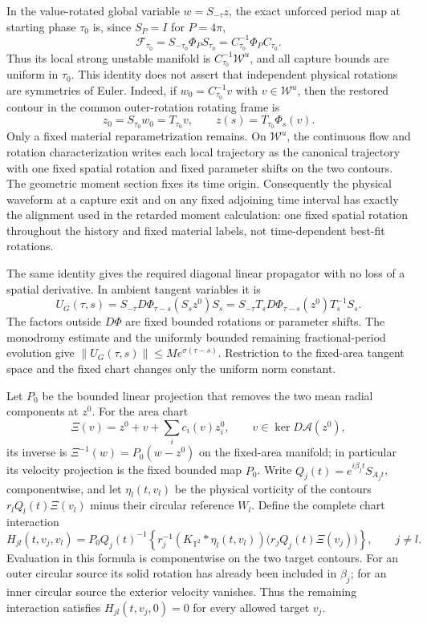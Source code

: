 \documentclass[11pt]{amsart}
\theoremstyle{remark}
\numberwithin{equation}{section}
\begin{document}
In the value-rotated global variable $w=S_{-\tau}z$, the exact unforced
period map at starting phase $\tau_0$ is, since $S_P=I$ for $P=4\pi$,
\begin{equation}\label{ib:phase-conjugacy}
 \mathcal F_{\tau_0}=S_{-\tau_0}\Phi_P S_{\tau_0}
 =C_{\tau_0}^{-1}\Phi_P C_{\tau_0}.
\end{equation}
Thus its local strong unstable manifold is
$C_{\tau_0}^{-1}\mathcal W^u$, and all capture bounds are uniform in $\tau_0$.
This identity does not assert that independent physical rotations are
symmetries of Euler. Indeed, if $w_0=C_{\tau_0}^{-1}v$ with $v\in \mathcal W^u$,
then the restored contour in the common outer-rotation rotating frame is
\[
 z_0=S_{\tau_0}w_0=T_{\tau_0}v,\qquad
 z(s)=T_{\tau_0}\Phi_s(v).
\]
Only a fixed material reparametrization remains. On $\mathcal W^u$, the continuous
flow and rotation characterization writes each local trajectory as the
canonical trajectory with one fixed spatial rotation and fixed parameter
shifts on the two contours. The geometric moment section fixes its time
origin. Consequently the physical waveform at a capture exit and on any
fixed adjoining time interval has exactly the alignment used in the
retarded moment calculation: one fixed spatial rotation throughout the history and fixed
material labels, not time-dependent best-fit rotations.

The same identity gives the required diagonal linear propagator with no
loss of a spatial derivative. In ambient tangent variables it is
\[
 U_G(\tau,s)=S_{-\tau}
 D\Phi_{\tau-s}(S_s z^0)S_s
 =S_{-\tau}T_sD\Phi_{\tau-s}(z^0)T_s^{-1}S_s.
\]
The factors outside $D\Phi$ are fixed bounded rotations or parameter
shifts. The monodromy estimate and the uniformly bounded remaining
fractional-period evolution give
$\|U_G(\tau,s)\|\le M e^{\sigma(\tau-s)}$.
Restriction to the fixed-area tangent space and the fixed chart changes
only the uniform norm constant.

Let $P_0$ be the bounded linear projection that
removes the two mean radial components at $z^0$. For the area chart
\[
 \Xi(v)=z^0+v+\sum_i c_i(v)z_i^0,
 \qquad v\in\ker D\mathcal A(z^0),
\]
its inverse is $\Xi^{-1}(w)=P_0(w-z^0)$ on the fixed-area manifold;
in particular its velocity projection is the fixed bounded map $P_0$.
Write $Q_j(t)=e^{i\beta_jt}S_{A_jt}$, componentwise, and let
$\eta_l(t,v_l)$ be the physical vorticity of the contours
$r_lQ_l(t)\Xi(v_l)$ minus their circular reference $W_l$.
Define the complete chart interaction
\[
 H_{jl}(t,v_j,v_l)=P_0Q_j(t)^{-1}
 \left\{r_j^{-1}(K_{\mathbb T^2}*\eta_l(t,v_l))
        \bigl(r_jQ_j(t)\Xi(v_j)\bigr)\right\},
 \qquad j\ne l.
\]
Evaluation in this formula is componentwise on the two target contours.
For an outer circular source its solid rotation has already been included
in $\beta_j$; for an inner circular source the exterior velocity vanishes.
Thus the remaining interaction satisfies
$H_{jl}(t,v_j,0)=0$ for every allowed target $v_j$.
\end{document}
